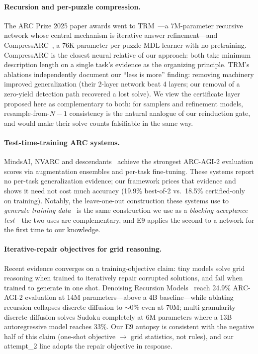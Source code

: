 \documentclass[11pt]{article}
\begin{document}
\paragraph{Recursion and per-puzzle compression.}
The ARC Prize 2025 paper awards went to
TRM~\citep{puigcerver2025trm}---a 7M-parameter recursive network whose
central mechanism is iterative answer refinement---and
CompressARC~\citep{bober2025compressarc}, a 76K-parameter per-puzzle MDL
learner with no pretraining.  CompressARC is the closest neural relative of
our approach: both take minimum description length on a single task's
evidence as the organizing principle.  TRM's ablations independently
document our ``less is more'' finding: removing machinery improved
generalization (their 2-layer network beat 4 layers; our removal of a
zero-yield detection path recovered a lost solve).  We view the certificate
layer proposed here as complementary to both: for samplers and refinement
models, resample-from-$N{-}1$ consistency is the natural analogue of our
reinduction gate, and would make their solve counts falsifiable in the same
way.

\paragraph{Test-time-training ARC systems.}
MindsAI, NVARC and descendants~\citep{mindsai2024arcprize,
akyurek2024loo} achieve the strongest ARC-AGI-2 evaluation scores via
augmentation ensembles and per-task fine-tuning.  These systems report no
per-task generalization evidence; our framework prices that evidence and
shows it need not cost much accuracy (19.9\% best-of-2 vs.\ 18.5\%
certified-only on training).  Notably, the leave-one-out construction these
systems use to \emph{generate training data}~\citep{akyurek2024loo} is the
same construction we use as a \emph{blocking acceptance test}---the two
uses are complementary, and E9 applies the second to a network for the
first time to our knowledge.

\paragraph{Iterative-repair objectives for grid reasoning.}
Recent evidence converges on a training-objective claim: tiny models solve
grid reasoning when trained to iteratively repair corrupted solutions, and
fail when trained to generate in one shot.  Denoising Recursion
Models~\citep{puigcerver2025trm} reach 24.9\% ARC-AGI-2 evaluation at 14M
parameters---above a 4B baseline---while ablating recursion collapses
discrete diffusion to ${\sim}0\%$ even at 70M; multi-granularity discrete
diffusion solves Sudoku completely at 6M parameters where a 13B
autoregressive model reaches 33\%.  Our E9 autopsy is consistent with the
negative half of this claim (one-shot objective $\to$ grid statistics, not
rules), and our attempt\_2 line adopts the repair objective in response.
\end{document}
